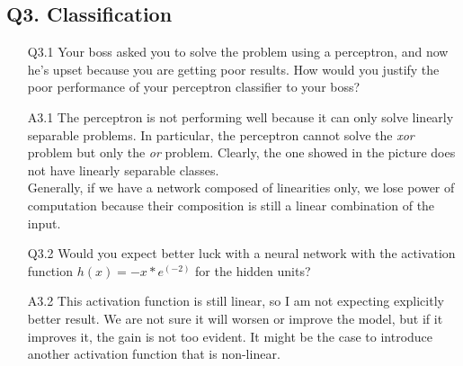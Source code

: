 \documentclass[11pt]{scrartcl}
\begin{document}
\subsection*{Q3. Classification}
\begin{itemize}
\item[Q3.1] Your boss asked you to solve the problem using a perceptron, and now he's upset because you are getting poor results. How would you justify the poor performance of your perceptron classifier to your boss?
\item[A3.1] The perceptron is not performing well because it can only solve linearly separable problems. In particular, the perceptron cannot solve the \textit{xor} problem but only the \textit{or} problem. Clearly, the one showed in the picture does not have linearly separable classes. \\
Generally, if we have a network composed of linearities only, we lose power of computation because their composition is still a linear combination of the input.

\item[Q3.2] Would you expect better luck with a neural network with the activation function $h(x) = - x * e^{(-2)}$ for the hidden units?
\item[A3.2] This activation function is still linear, so I am not expecting explicitly better result. We are not sure it will worsen or improve the model, but if it improves it, the gain is not too evident. It might be the case to introduce another activation function that is non-linear.


\end{itemize}
\end{document}
